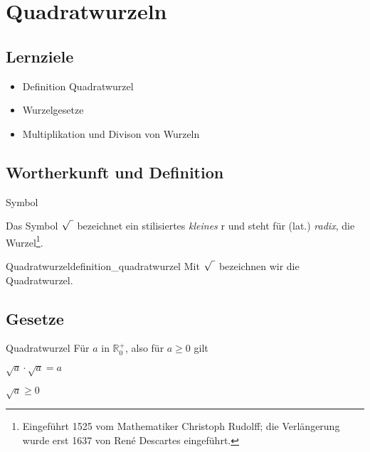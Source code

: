 
\section{Quadratwurzeln}\index{$\sqrt{\mathstrut{}\,}$}

\subsection*{Lernziele}

\begin{itemize}
\item Definition Quadratwurzel
\item Wurzelgesetze
\item Multiplikation und Divison von Wurzeln
\end{itemize}



\noTRAINER{\vspace{35mm}}

\subsection{Wortherkunft und Definition}

\begin{bemerkung}{Symbol}{}
  
Das Symbol $\sqrt{\vphantom{b} \,\,}$
bezeichnet ein stilisiertes {\textit{kleines}} {\huge{r}} und steht für
  (lat.) \textit{radix}, die Wurzel\footnote{Eingeführt 1525 vom
  Mathematiker Christoph Rudolff; die Verlängerung wurde erst 1637 von
René Descartes eingeführt.}.
\end{bemerkung}


\begin{definition}{Quadratwurzel}{definition_quadratwurzel}
Mit $\sqrt{\vphantom{b} \,\,}$ bezeichnen wir die
Quadratwurzel.
\end{definition}

\newpage

\subsection{Gesetze}

\begin{definition}{Quadratwurzel}{}
Für $a$ in $\mathbb{R}_0^{+}$, also für $a\ge 0$ gilt

$\sqrt{a} \cdot \sqrt{a} = a$

$\sqrt{a} \ge 0$
\end{definition}



